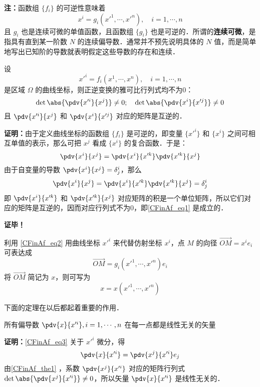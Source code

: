 \textbf{注：}函数组 $\{f_i\}$ 的可逆性意味着
\begin{equation}\label{CFinAf_eq2}
x^i=g_i(x'^1,\cdots,x'^n),\quad i=1,\cdots,n
\end{equation}
且 $g_i$ 也是连续可微的单值函数，且函数组 $\{g_i\}$ 也是可逆的．所谓的\textbf{连续可微}，是指具有直到某一阶数 $N$ 的连续偏导数．通常并不预先说明具体的 $N$ 值，而是简单地写出已知阶的导数就表明假定这些导数的存在和连续．
\begin{theorem}{}\label{CFinAf_the1}
设
\begin{equation}
x'^i=f_i(x^1,\cdots,x^n),\quad i=1,\cdots,n
\end{equation}
是区域 $\Omega$ 的曲线坐标，则正逆变换的雅可比行列式均不为0：
\begin{equation}\label{CFinAf_eq1}
\det\abs{\pdv{x'^i}{x^j}}\neq0;\quad\det\abs{\pdv{x^i}{x'^j}}\neq0
\end{equation}
且 $\pdv{x'^i}{x^j}$ 和 $\pdv{x^i}{x'^j}$ 对应的矩阵是互逆的．
\end{theorem}
\textbf{证明：}由于定义曲线坐标的函数组 $\{f_i\}$ 是可逆的，即变量 $\{x'^i\}$ 和 $\{x^i\}$ 之间可相互单值的表示，那么可把 $x^j$ 看成 $\{x^i\}$ 的复合函数．于是：
\begin{equation}
\pdv{x^i}{x^j}=\pdv{x^i}{x'^k}\pdv{x'^k}{x^j}
\end{equation}
由于自变量的导数 $\pdv{x^i}{x^j}=\delta^i_j$，那么
\begin{equation}
\pdv{x^i}{x^j}=\pdv{x^i}{x'^k}\pdv{x'^k}{x^j}=\delta^i_j
\end{equation}
即 $\pdv{x^i}{x'^k}$ 和 $\pdv{x'^k}{x^j}$ 对应矩阵的积是一个单位矩阵，所以它们对应的矩阵是互逆的，因而对应行列式不为0，即\autoref{CFinAf_eq1} 是成立的．

 
\textbf{证毕！}

利用 \autoref{CFinAf_eq2} 用曲线坐标 $x'^i$ 来代替仿射坐标 $x^i$，点 $M$ 的向径 $\overrightarrow {OM}=x^i e_i$ 可表达成
\begin{equation}\label{CFinAf_eq3}
\overrightarrow{OM}=g_i(x'^1,\cdots,x'^n)e_i
\end{equation}
将 $\overrightarrow{OM}$ 简记为 $x$，则可写为
\begin{equation}
x=x(x'^1,\cdots,x'^n)
\end{equation}

下面的定理在以后都起着重要的作用．
\begin{theorem}{}
所有偏导数 $\pdv{x}{x'^i},i=1,\cdots,n$ 在每一点都是线性无关的矢量
\end{theorem}
\textbf{证明：}\autoref{CFinAf_eq3} 关于 $x'^i$ 微分，得
\begin{equation}
\pdv{x}{x'^i}=\pdv{x^j}{x'^i}e_j
\end{equation}
由\autoref{CFinAf_the1} ，系数 $\pdv{x^j}{x'^i}$ 对应的矩阵行列式 $\det\abs{\pdv{x^j}{x'^i}}\neq0$，所以矢量 $\pdv{x}{x'^i}$ 是线性无关的．


